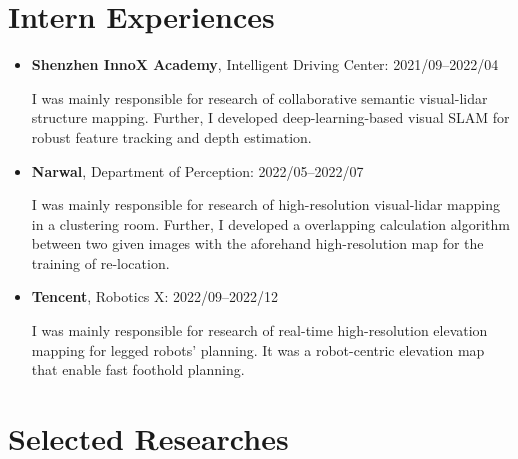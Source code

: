 \documentclass[11pt,a4paper,sans]{moderncv}        %
\begin{document}
\section{Intern Experiences}

\begin{itemize}

\item{\textbf{Shenzhen InnoX Academy}, Intelligent Driving Center: 2021/09--2022/04

I was mainly responsible for research of collaborative semantic visual-lidar structure mapping. Further, I developed deep-learning-based visual SLAM for robust feature tracking and depth estimation.}

\item{\textbf{Narwal}, Department of Perception: 2022/05--2022/07

I was mainly responsible for research of high-resolution visual-lidar mapping in a clustering room. Further, I developed a overlapping calculation algorithm between two given images with the aforehand high-resolution map for the training of re-location.}

\item{\textbf{Tencent}, Robotics X: 2022/09--2022/12

I was mainly responsible for research of real-time high-resolution elevation mapping for legged robots' planning. It was a robot-centric elevation map that enable fast foothold planning.
}

\end{itemize}

\section{Selected Researches}
\end{document}
